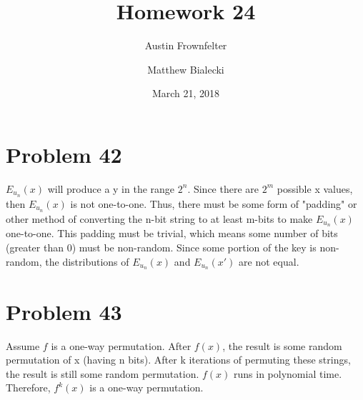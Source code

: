 \documentclass{article}
\title{Homework 24}
\author{Austin Frownfelter \and Matthew Bialecki}
\date{March 21, 2018}
\begin{document}
\maketitle

\section{Problem 42}

$E_{u_n}(x)$ will produce a y in the range $2^n$.  Since there are $2^m$ possible x values, then $E_{u_n}(x)$ is not one-to-one.  Thus, there must be some form of "padding" or other method of converting the n-bit string to at least m-bits to make $E_{u_n}(x)$ one-to-one.  This padding must be trivial, which means some number of bits (greater than 0) must be non-random.  Since some portion of the key is non-random, the distributions of $E_{u_n}(x)$ and $E_{u_n}(x')$ are not equal.


\section{Problem 43}

Assume $f$ is a one-way permutation.  After $f(x)$, the result is some random permutation of x (having n bits).  After k iterations of permuting these strings, the result is still some random permutation.  $f(x)$ runs in polynomial time.  Therefore, $f^k(x)$ is a one-way permutation.
\end{document}
